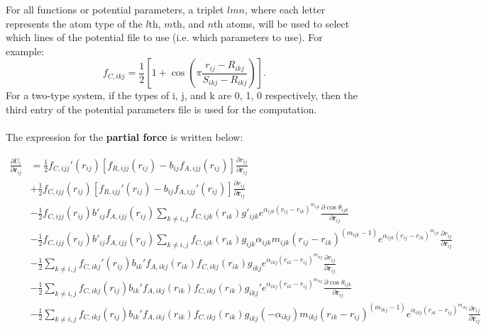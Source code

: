 \documentclass[12pt,a4paper]{report}
\newcommand{\vect}[1]{\boldsymbol{#1}}
\begin{document}
For all functions or potential parameters, a triplet $lmn$, where each letter represents the atom type of the $l$th, $m$th, and $n$th atoms, will be used to select which lines of the potential file to use (i.e. which parameters to use). For example:
\begin{equation}
    f_{C,ikj} = \frac{1}{2} \left[1 + \cos \left( \pi \frac{r_{ij} - R_{ikj}}{S_{ikj} - R_{ikj}} \right) \nonumber
\right]. 
\end{equation}
For a two-type system, if the types of i, j, and k are 0, 1, 0 respectively, then the third entry of the potential parameters file is used for the computation.
\\\\
The expression for the \textbf{partial force} is written below:

\begin{align}
\frac{\partial U_i}{\partial \vect{r}_{ij}}
&= \frac{1}{2}f_{C,ijj}'(r_{ij})[f_{R,ijj}(r_{ij})-b_{ij}f_{A,ijj}(r_{ij})]\frac{\partial r_{ij}}{\partial \vect{r}_{ij}} \nonumber \\
&+ \frac{1}{2}f_{C,ijj}(r_{ij})[f_{R,ijj}'(r_{ij})-b_{ij}f_{A,ijj}'(r_{ij})]\frac{\partial r_{ij}}{\partial \vect{r}_{ij}} \nonumber \\
&- \frac{1}{2}f_{C,ijj}(r_{ij})b'_{ij}f_{A,ijj}(r_{ij})\sum_{k\neq i,j}f_{C,ijk}(r_{ik})g'_{ijk} e^{\alpha_{ijk}(r_{ij}-r_{ik})^{m_{ijk}}}\frac{\partial \cos\theta_{ijk}}{\partial \vect{r}_{ij}} \nonumber \\
&- \frac{1}{2}f_{C,ijj}(r_{ij})b'_{ij}f_{A,ijj}(r_{ij})\sum_{k\neq i,j}f_{C,ijk}(r_{ik})g_{ijk}\alpha_{ijk}m_{ijk}(r_{ij}-r_{ik})^{(m_{ijk}-1)}e^{\alpha_{ijk}(r_{ij}-r_{ik})^{m_{ijk}}}\frac{\partial r_{ij}}{\partial \vect{r}_{ij}} \nonumber\\
&- \frac{1}{2}\sum_{k\neq i,j}f_{C,ikj}'(r_{ij})b_{ik}'f_{A,ikj}(r_{ik})f_{C,ikj}(r_{ik})g_{ikj}e^{\alpha_{ikj}(r_{ik}-r_{ij})^{m_{ikj}}}\frac{\partial r_{ij}}{\partial \vect{r}_{ij}} \nonumber \\
&- \frac{1}{2}\sum_{k\neq i,j}f_{C,ikj}(r_{ij})b_{ik}'f_{A,ikj}(r_{ik})f_{C,ikj}(r_{ik})g_{ikj}'e^{\alpha_{ikj}(r_{ik}-r_{ij})^{m_{ikj}}}\frac{\partial \cos\theta_{ijk}}{\partial \vect{r}_{ij}} \nonumber \\
&- \frac{1}{2}\sum_{k\neq i,j}f_{C,ikj}(r_{ij})b_{ik}'f_{A,ikj}(r_{ik})f_{C,ikj}(r_{ik})g_{ikj}(-\alpha_{ikj})m_{ikj}(r_{ik}-r_{ij})^{(m_{ikj}-1)}e^{\alpha_{ikj}(r_{ik}-r_{ij})^{m_{ikj}}}\frac{\partial r_{ij}}{\partial \vect{r}_{ij}}
\end{align}
\end{document}
